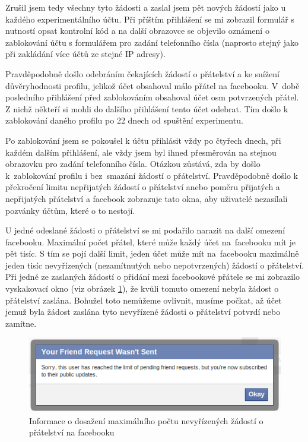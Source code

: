\documentclass[thesis=M,czech]{FITthesis}[2013/05/10]
\begin{document}
Zrušil jsem tedy všechny tyto žádosti a zaslal jsem pět nových žádostí jako u každého experimentálního účtu. Při příštím přihlášení se mi zobrazil formulář s nutností opsat kontrolní kód a na další obrazovce se objevilo oznámení o zablokování účtu s formulářem pro zadání telefonního čísla (naprosto stejný jako při zakládání více účtů ze stejné IP adresy).

Pravděpodobně došlo odebráním čekajících žádostí o přátelství a ke snížení důvěryhodnosti profilu, jelikož účet obsahoval málo přátel na facebooku. V~době posledního přihlášení před zablokováním obsahoval účet osm potvrzených přátel. Z nichž někteří si mohli do dalšího přihlášení tento účet odebrat. Tím došlo k zablokování daného profilu po 22 dnech od spuštění experimentu. 

Po zablokování jsem se pokoušel k účtu přihlásit vždy po čtyřech dnech, při každém dalším přihlášení, ale vždy jsem byl ihned přesměrován na stejnou obrazovku pro zadání telefonního čísla. Otázkou zůstává, zda by došlo k~zablokování profilu i bez~smazání žádostí o přátelství. Pravděpodobně došlo k překročení limitu nepřijatých žádostí o přátelství anebo poměru přijatých a nepřijatých přátelství a facebook zobrazuje tato okna, aby uživatelé nezasílali pozvánky účtům, které o to nestojí.

U jedné odeslané žádosti o přátelství se mi podařilo narazit na další omezení facebooku. Maximální počet přátel, které může každý účet na~facebooku mít je pět tisíc. S tím se pojí další limit, jeden účet může mít na~facebooku maximálně jeden tisíc nevyřízených (nezamítnutých nebo nepotvrzených) žádostí o přátelství. Při jedné ze zaslaných žádostí o přidání mezi facebookové přátele se mi zobrazilo vyskakovací okno (viz obrázek \ref{fig:friendRequestsLimitReached}), že kvůli tomuto omezení nebyla žádost o přátelství zaslána. Bohužel toto nemůžeme ovlivnit, musíme počkat, až účet jemuž byla žádost zaslána tyto nevyřízené žádosti o přátelství potvrdí nebo zamítne.

\begin{figure}[h]
\begin{center}
\includegraphics[width=5in]{figures/friendRequestsLimitReached.png}
\caption{Informace o dosažení maximálního počtu nevyřízených žádostí o přátelství na facebooku}
\label{fig:friendRequestsLimitReached}
\end{center}
\end{figure}
\end{document}
